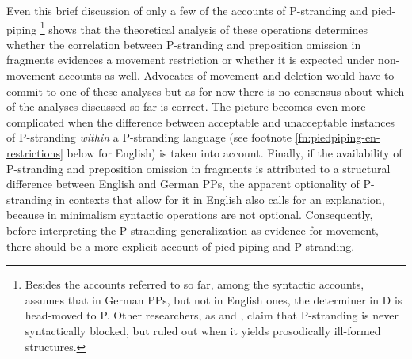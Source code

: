 Even this brief discussion of only a few of the accounts of P-stranding and pied-piping%
%
\footnote{\label{fn:pstranding-alternatives}
Besides the accounts referred to so far, among the syntactic accounts, \citet{sato2011} assumes that in German PPs, but not in English ones, the determiner in D is head-moved to P. Other researchers,  as \citet{tokizaki2010} and \citet{philippova2014}, claim that P-stranding is never syntactically blocked, but ruled out when it yields prosodically ill-formed structures.}\afterfn%
%
shows that the theoretical analysis of these operations determines whether the correlation between P-stranding and preposition omission in fragments evidences a movement restriction or whether it is expected under non-movement accounts as well. Advocates of movement and deletion would have to commit to one of these analyses but as for now there is no consensus about which of the analyses discussed so far is correct. The picture becomes even more complicated when the difference between acceptable and unacceptable instances of P-stranding \textit{within} a P-stranding language (see footnote \ref{fn:piedpiping-en-restrictions} below for English) is taken into account. Finally, if the availability of P-stranding and preposition omission in fragments is attributed to a structural difference between English and German PPs, the apparent optionality of P-stranding in contexts that allow for it in English also calls for an explanation, because in minimalism syntactic operations are not optional. Consequently, before interpreting the P-stranding generalization as evidence for movement, there should be a more explicit account of pied-piping and P-stranding.


